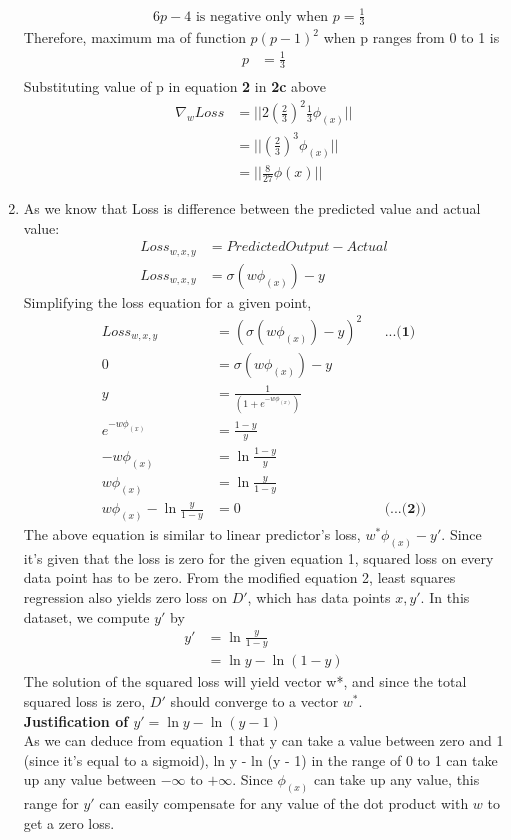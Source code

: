 \documentclass[12pt]{article}
\begin{document}
\begin{enumerate}[label=(\alph*)]
 \begin{align*}
 6p - 4 \text{ is negative only when $p = \frac{1}{3}$ }
 \end{align*}
 Therefore, maximum ma of function $p(p-1)^2$ when p ranges from 0 to 1 is
 \begin{align*}
 p &= \frac{1}{3} \\
 \end{align*}
 Substituting value of p in equation \textbf{2} in \textbf{2c} above
 \begin{align*}
 \nabla_w Loss &= || 2 (\frac{2}{3})^2 \frac{1}{3} \phi_{(x)} || \\
 &= || (\frac{2}{3})^3 \phi_{(x)} || \\
 &= || \frac{8}{27} \phi{(x)} ||
 \end{align*}
 \item As we know that Loss is difference between the predicted value and actual value:
 \begin{align*}
 Loss_{w, x, y} &= Predicted Output - Actual \\
 Loss_{w, x, y}&= \sigma(w\phi_{(x)}) - y
 \end{align*}
 Simplifying the loss equation for a given point,
 \begin{align*}
 Loss_{w, x, y}&=( \sigma(w\phi_{(x)}) - y)^2 && \textbf{...(1)}\\
 0 &= \sigma(w\phi_{(x)}) - y \\
 y &= \frac{1}{(1 + e^{-w\phi_{(x)}})} \\
e^{-w\phi_{(x)}} &= \frac{1 - y}{y} \\
-w\phi_{(x)} &= \ln \frac{1-y}{y} \\
w\phi_{(x)} &= \ln \frac{y}{1 - y} \\
w\phi_{(x)} - \ln \frac{y}{1-y} &= 0 && \textbf{(...(2))}
 \end{align*}
 The above equation is similar to linear predictor's loss, $w^*\phi_{(x)} - y'$. Since it's given that the loss is zero for the given equation 1, squared loss on every data point has to be zero. From the modified equation 2, least squares regression also yields zero loss on $D'$, which has data points $x, y'$. In this dataset, we compute $y'$ by\\
 \begin{align*}
 y' &= \ln \frac{y}{1-y} \\
 &= \ln y - \ln(1 - y)
 \end{align*}
 The solution of the squared loss will yield vector w*, and since the total squared loss is zero, $D'$ should converge to a vector $w^*$. \\
 
 \textbf{Justification of $y' = \ln y - \ln(y-1)$} \\
 As we can deduce from equation 1 that y can take a value between zero and 1 (since it's equal to a sigmoid), ln y - ln (y - 1) in the range of 0 to 1 can take up any value between $-\infty$ to $+\infty$. Since $\phi_(x)$ can take up any value, this range for $y'$ can easily compensate for any value of the dot product with $w$ to get a zero loss.
 
\end{enumerate} 
\end{document}
